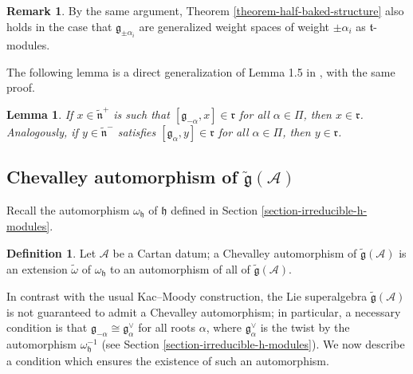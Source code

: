 \documentclass[12pt, a4paper, reqno]{amsart}
\def\AA{\mathcal{A}}
\def\g{\mathfrak{g}}
\def\h{\mathfrak{h}}
\newtheorem{lemma}{Lemma}
\theoremstyle{definition}
\newtheorem{definition}{Definition}
\theoremstyle{definition}
\newtheorem{remark}{Remark}
\theoremstyle{definition}
\numberwithin{theorem}{section}
\numberwithin{lemma}{section}
\numberwithin{remark}{section}
\numberwithin{definition}{section}
\numberwithin{corollary}{section}
\numberwithin{proposition}{section}
\numberwithin{example}{section}
\begin{document}
	\begin{remark}
		By the same argument, Theorem \ref{theorem-half-baked-structure} also holds in the case that \(\mathfrak{g}_{\pm \alpha_i}\) are generalized weight spaces of weight \(\pm \alpha_i\) as \(\mathfrak{t}\)-modules.
	\end{remark}
	
	
	
	The following lemma is a direct generalization of Lemma 1.5 in \cite{K}, with the same proof.
	
	\begin{lemma}\label{lemma-maximal-ideal}
		If \(x \in \tilde{\mathfrak{n}}^+\) is such that \([\mathfrak{g}_{-\alpha},x] \in \mathfrak{r}\) for all \(\alpha \in \Pi\), then \(x \in \mathfrak{r}\). Analogously, if \(y \in \tilde{\mathfrak{n}}^-\) satisfies \([\mathfrak{g}_{\alpha},y] \in \mathfrak{r}\) for all \(\alpha \in \Pi\), then \(y \in \mathfrak{r}\).
	\end{lemma}
		
	\subsection{Chevalley automorphism of \(\tilde{\mathfrak{g}}(\mathcal{A})\)}\label{subsection-Chevalley}
	
	Recall the automorphism $\omega_{\h}$ of $\h$ defined in Section \ref{section-irreducible-h-modules}.
	\begin{definition}
		Let $\AA$ be a Cartan datum; a Chevalley automorphism of $\tilde{\g}(\AA)$ is an extension $\tilde{\omega}$ of $\omega_{\h}$ to an automorphism of all of $\tilde{\g}(\AA)$.  
	\end{definition}
	
	
	In contrast with the usual Kac--Moody construction, the Lie superalgebra \(\tilde{\mathfrak{g}}(\mathcal{A})\) is not guaranteed to admit a Chevalley automorphism; in particular, a necessary condition is that $\g_{-\alpha}\cong\g_{\alpha}^\vee$ for all roots $\alpha$, where \(\mathfrak{g}_{\alpha}^\vee\) is the twist by the automorphism \(\omega_{\mathfrak{h}}^{-1}\) (see Section \ref{section-irreducible-h-modules}).  We now describe a condition which ensures the existence of such an automorphism.
	
\end{document}
